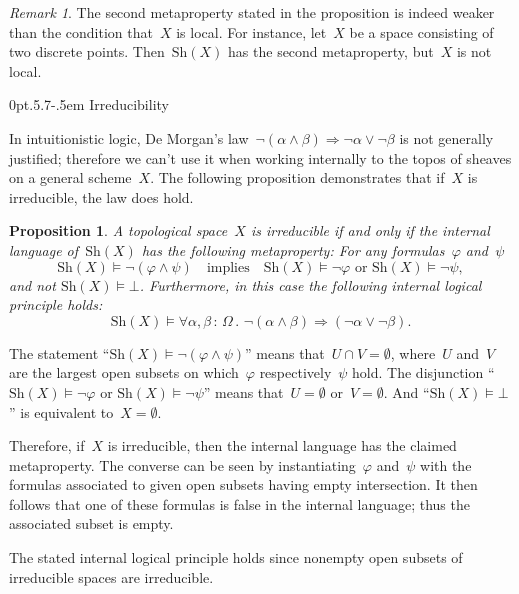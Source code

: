 \documentclass[10pt,reqno,a4paper]{amsbook}
\makeatletter
\theoremstyle{definition}
\theoremstyle{plain}
\newtheorem{prop}[defn]{Proposition}
\theoremstyle{remark}
\newtheorem{rem}[defn]{Remark}
\newcommand{\Sh}{\mathrm{Sh}}
\newcommand{\?}{\,{:}\,}
\renewcommand{\_}{\mathpunct{.}\,}
\renewenvironment{proof}[1][\proofname]{\par
  \pushQED{\qed}%
  \normalfont \topsep6\p@\@plus6\p@\relax
  \trivlist
  \item[\hskip\labelsep
        \itshape
    #1\@addpunct{.}]\ignorespaces
}{%
  \popQED\endtrivlist\@endpefalse
}
\def\subsection{\@startsection{subsection}{2}%
  {0pt}{.5\linespacing\@plus.7\linespacing}{-.5em}%
  {\normalfont\bfseries}}
\makeatother
\begin{document}
\begin{rem}The second metaproperty stated in the proposition is indeed weaker
than the condition that~$X$ is local. For instance, let~$X$ be a space consisting
of two discrete points. Then~$\Sh(X)$ has the second metaproperty, but~$X$ is
not local.\end{rem}


\subsection{Irreducibility}

In intuitionistic logic, De Morgan's law~$\neg(\alpha \wedge \beta)
\Rightarrow \neg\alpha \vee \neg\beta$ is not generally justified; therefore we
can't use it when working internally to the topos of sheaves on a general scheme~$X$.
The following proposition demonstrates that if~$X$ is irreducible, the law
does hold.

\begin{prop}\label{prop:irreducibility-internally}
A topological space~$X$ is irreducible if and only if the internal
language of~$\Sh(X)$ has the following metaproperty: For any
formulas~$\varphi$ and~$\psi$
\[ \Sh(X) \models \neg(\varphi \wedge \psi)
  \quad\text{implies}\quad
  \Sh(X) \models \neg\varphi \text{ or }
  \Sh(X) \models \neg\psi, \]
and not $\Sh(X) \models \bot$.
Furthermore, in this case the following internal logical principle holds:
\[ \Sh(X) \models \forall \alpha,\beta \? \Omega\_
  \neg(\alpha \wedge \beta) \Rightarrow (\neg\alpha \vee \neg\beta). \]
\end{prop}
\begin{proof}The statement ``$\Sh(X) \models \neg(\varphi \wedge \psi)$'' means
that~$U \cap V = \emptyset$, where~$U$ and~$V$ are the largest open subsets on
which~$\varphi$ respectively~$\psi$ hold. The disjunction ``$\Sh(X) \models
\neg\varphi$ or $\Sh(X) \models \neg\psi$'' means that~$U = \emptyset$ or~$V =
\emptyset$. And ``$\Sh(X) \models \bot$'' is equivalent to~$X = \emptyset$.

Therefore, if~$X$ is irreducible, then the internal language has the claimed metaproperty. The converse
can be seen by instantiating~$\varphi$ and~$\psi$ with the formulas associated
to given open subsets having empty intersection. It then follows that one of
these formulas is false in the internal language; thus the associated subset is
empty.

The stated internal logical principle holds since nonempty open subsets of irreducible spaces are
irreducible.
\end{proof}
\end{document}

